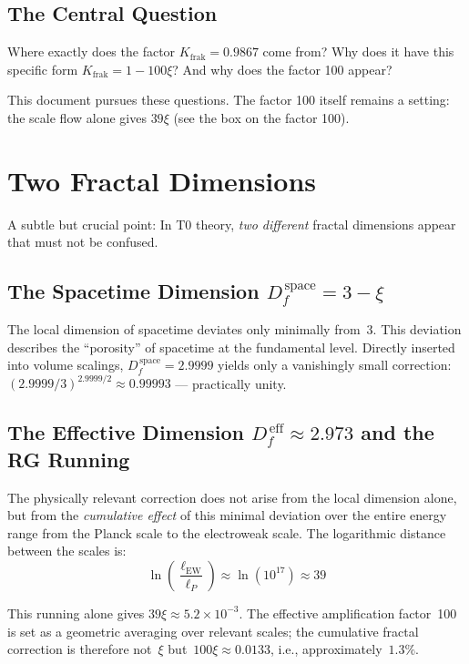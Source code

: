 	\subsection{The Central Question}
	
	Where exactly does the factor $K_{\text{frak}} = 0.9867$ come from? Why does it have this specific form $K_{\text{frak}} = 1 - 100\xi$? And why does the factor 100 appear?
	
	This document pursues these questions. The factor 100 itself remains a setting: the scale flow alone gives $39\xi$ (see the box on the factor 100).
	
	\section{Two Fractal Dimensions}
	
	A subtle but crucial point: In T0 theory, \emph{two different} fractal dimensions appear that must not be confused.
	
	\subsection{The Spacetime Dimension $D_f^{\,\text{space}} = 3 - \xi$}
	
	The local dimension of spacetime deviates only minimally from~3. This deviation describes the ``porosity'' of spacetime at the fundamental level. Directly inserted into volume scalings, $D_f^{\,\text{space}} = 2.9999$ yields only a vanishingly small correction: $(2.9999/3)^{2.9999/2} \approx 0.99993$ --- practically unity.
	
	\subsection{The Effective Dimension $D_f^{\,\text{eff}} \approx 2.973$ and the RG Running}
	
	The physically relevant correction does not arise from the local dimension alone, but from the \emph{cumulative effect} of this minimal deviation over the entire energy range from the Planck scale to the electroweak scale. The logarithmic distance between the scales is:
	\begin{equation}
		\ln\!\left(\frac{\ell_{\text{EW}}}{\ell_P}\right) \approx \ln(10^{17}) \approx 39
	\end{equation}
	
	This running alone gives $39\xi \approx 5.2\times10^{-3}$. The effective amplification factor~100 is set as a geometric averaging over relevant scales; the cumulative fractal correction is therefore not~$\xi$ but~$100\xi \approx 0.0133$, i.e., approximately~$1.3\%$.
	

